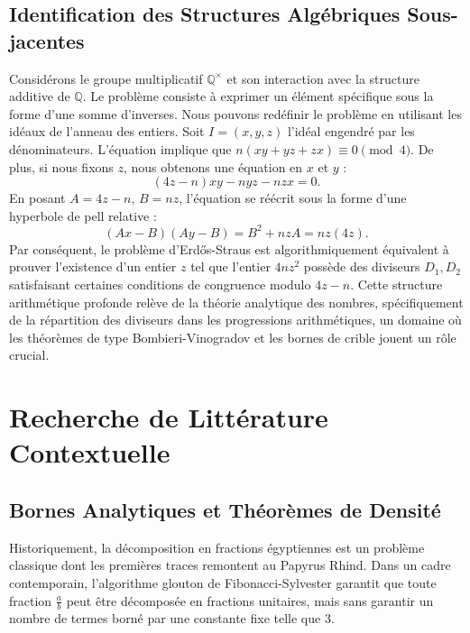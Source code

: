 \documentclass[12pt, a4paper]{article}
\begin{document}
\subsection{Identification des Structures Algébriques Sous-jacentes}
Considérons le groupe multiplicatif $\mathbb{Q}^{\times}$ et son interaction avec la structure additive de $\mathbb{Q}$. Le problème consiste à exprimer un élément spécifique sous la forme d'une somme d'inverses.
Nous pouvons redéfinir le problème en utilisant les idéaux de l'anneau des entiers. Soit $I = (x, y, z)$ l'idéal engendré par les dénominateurs. L'équation implique que $n(xy + yz + zx) \equiv 0 \pmod 4$.
De plus, si nous fixons $z$, nous obtenons une équation en $x$ et $y$ :
\begin{equation}
(4z - n)xy - nyz - nzx = 0.
\end{equation}
En posant $A = 4z - n$, $B = nz$, l'équation se réécrit sous la forme d'une hyperbole de pell relative :
\begin{equation}
(Ax - B)(Ay - B) = B^2 + nz A = nz(4z).
\end{equation}
Par conséquent, le problème d'Erd\H{o}s-Straus est algorithmiquement équivalent à prouver l'existence d'un entier $z$ tel que l'entier $4nz^2$ possède des diviseurs $D_1, D_2$ satisfaisant certaines conditions de congruence modulo $4z - n$.
Cette structure arithmétique profonde relève de la théorie analytique des nombres, spécifiquement de la répartition des diviseurs dans les progressions arithmétiques, un domaine où les théorèmes de type Bombieri-Vinogradov et les bornes de crible jouent un rôle crucial.

\newpage

\section{Recherche de Littérature Contextuelle}
\subsection{Bornes Analytiques et Théorèmes de Densité}
Historiquement, la décomposition en fractions égyptiennes est un problème classique dont les premières traces remontent au Papyrus Rhind. Dans un cadre contemporain, l'algorithme glouton de Fibonacci-Sylvester garantit que toute fraction $\frac{a}{b}$ peut être décomposée en fractions unitaires, mais sans garantir un nombre de termes borné par une constante fixe telle que $3$.
\end{document}
